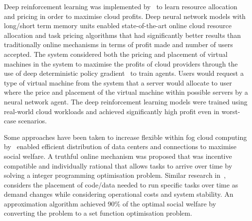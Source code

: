 Deep reinforcement learning was implemented by~\cite{Du2019} to learn resource allocation and pricing in order to
maximise cloud profits. Deep neural network models with long/short term memory units enabled state-of-the-art online
cloud resource allocation and task pricing algorithms that had significantly better results than traditionally
online mechanisms in terms of profit made and number of users accepted. The system considered both the pricing and
placement of virtual machines in the system to maximise the profits of cloud providers through the use of deep
deterministic policy gradient~\citep{ddpg} to train agents. Users would request a type of virtual machine from the
system that a server would allocate to user where the price and placement of the virtual machine within possible
servers by a neural network agent. The deep reinforcement learning models were trained using real-world cloud workloads
and achieved significantly high profit even in worst-case scenarios.

Some approaches have been taken to increase flexible within fog cloud computing by~\cite{Bi2019} enabled efficient
distribution of data centers and connections to maximise social welfare. A truthful online mechanism was
proposed that was incentive compatible and individually rational that allows tasks to arrive over time by solving a
integer programming optimisation problem. Similar research in~\cite{vaji_infocom}, considers the placement of code/data
needed to run specific tasks over time as demand changes while considering operational costs and system stability.
An approximation algorithm achieved 90\% of the optimal social welfare by converting the problem to a set function
optimisation problem.

